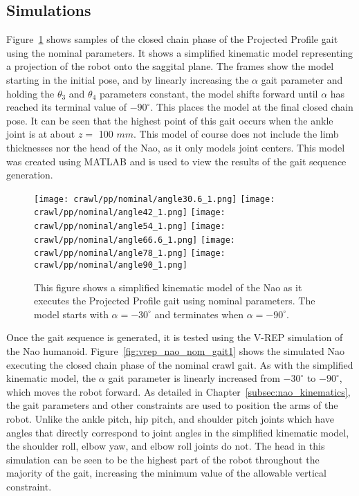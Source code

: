 \subsection{Simulations}
Figure~\ref{fig:pp_nom_gait1} shows samples of the closed chain phase of the Projected
Profile gait using the nominal parameters. It shows a simplified kinematic model
representing a projection of the robot onto the saggital plane. The frames show the
model starting in the initial pose, and by linearly increasing the $\alpha$ gait
parameter and holding the $\theta_3$ and $\theta_4$ parameters constant, the model
shifts forward until $\alpha$ has reached its terminal value of $-90^\circ$. This places the model
at the final closed chain pose. It can be seen that the highest point of this gait occurs
when the ankle joint is at about $z =$ 100 $mm$. This model of course does not include the limb thicknesses nor
the head of the Nao, as it only models joint centers. This model was created using MATLAB
and is used to view the results of the gait sequence generation.

\begin{figure}
\centering
\texttt{[image: crawl/pp/nominal/angle30.6\_1.png]}
\texttt{[image: crawl/pp/nominal/angle42\_1.png]}
\centering
\texttt{[image: crawl/pp/nominal/angle54\_1.png]}
\texttt{[image: crawl/pp/nominal/angle66.6\_1.png]}
\centering
\texttt{[image: crawl/pp/nominal/angle78\_1.png]}
\texttt{[image: crawl/pp/nominal/angle90\_1.png]}
\caption{This figure shows a simplified kinematic model of the Nao as it executes
         the Projected Profile gait using nominal parameters. The model starts with
         $\alpha = -30^\circ$ and terminates when $\alpha = -90^\circ$.}
\label{fig:pp_nom_gait1}
\end{figure}


Once the gait sequence is generated, it is tested using the V-REP simulation of the
Nao humanoid. Figure~\ref{fig:vrep_nao_nom_gait1} shows the simulated Nao executing
the closed chain phase of the nominal crawl gait. As with the simplified kinematic
model, the $\alpha$ gait parameter is linearly increased from $-30^\circ$ to $-90^\circ$,
which moves the robot forward. As detailed in Chapter~\ref{subsec:nao_kinematics}, the
gait parameters and other constraints are used to position the arms of the robot. Unlike
the ankle pitch, hip pitch, and shoulder pitch joints which have angles that directly correspond to
joint angles in the simplified kinematic model, the shoulder roll, elbow yaw, and elbow roll joints
do not. The head in this simulation can be seen to be the highest part of the robot
throughout the majority of the gait, increasing the minimum value of the allowable
vertical constraint.

